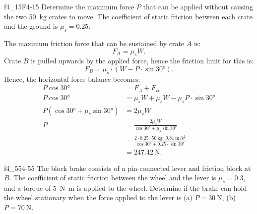 
\begin{problemwithimage}{f4_15}{F4-15}
  Determine the maximum force $P$ that can be applied without causing the two \qty{50}{\kg} crates to move.
  The coefficient of static friction between each crate and the ground is $\mu_s = \num{0,25}$.
\end{problemwithimage}

\begin{derivation}
  The maximum friction force that can be sustained by crate $A$ is:
  \begin{equation*}
    F_A = \mu_s W
  .\end{equation*}
  Crate $B$ is pulled upwards by the applied force, hence the friction limit for this is:
  \begin{equation*}
    F_B = \mu_s \cdot \left( W - P \cdot \sin \ang{30} \right)
  .\end{equation*}
  Hence, the horizontal force balance becomes:
  \begin{align*}
    P \cos \ang{30} &= F_A + F_B \\
    P \cos \ang{30} &= \mu_s W + \mu_s W - \mu_s P \cdot \sin \ang{30} \\
    P \left( \cos \ang{30} + \mu_s \sin \ang{30}  \right) &= 2 \mu_s W \\
    P &= \frac{2\mu_s W}{\cos \ang{30} + \mu_s \sin \ang{30} } \\
    &= \frac{2 \cdot \num{0.25} \cdot \qty{50}{\kg} \cdot \qty{9.81}{\m\per\second\squared} }{\cos \ang{30} + \num{0.25} \cdot \sin \ang{30} } \\
    &= \qty{247,42}{\N}
  .\end{align*}
\end{derivation}


\begin{problemwithimage}{f4_55}{4-55}
  The block brake consists of a pin-connected lever and friction block at $B$.
  The coefficient of static friction between the wheel and the lever is $\mu_s = \num{0,3}$, and a torque of \qty{5}{\N.\m} is applied to the wheel.
  Determine if the brake can hold the wheel stationary when the force applied to the lever is (a) $P = \qty{30}{\N}$, (b) $P = \qty{70}{\N}$.
\end{problemwithimage}

